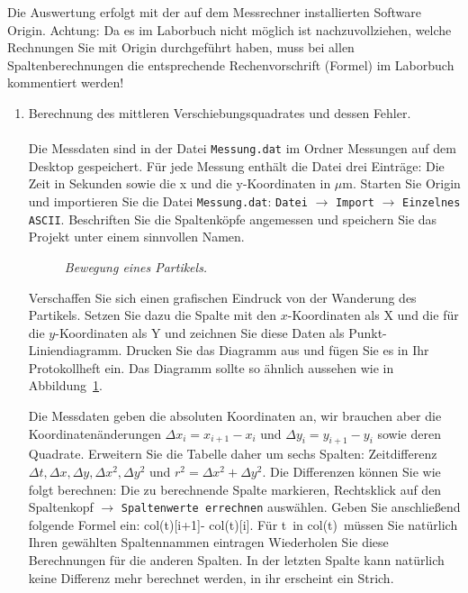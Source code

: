 \documentclass{../papanleitung}
\begin{document}
Die Auswertung erfolgt mit der auf dem Messrechner installierten Software Origin.
Achtung: Da es im Laborbuch nicht m\"{o}glich ist nachzuvollziehen, welche Rechnungen Sie mit Origin durchgef\"{u}hrt haben, muss bei allen Spaltenberechnungen die entsprechende Rechenvorschrift (Formel) im Laborbuch kommentiert werden!

\begin{enumerate}
\item Berechnung des mittleren Verschiebungsquadrates und dessen Fehler.\\
\\Die Messdaten sind in der Datei \verb"Messung.dat" im Ordner Messungen auf dem Desktop gespeichert. F\"{u}r jede Messung enth\"{a}lt die Datei drei Eintr\"{a}ge: Die Zeit in Sekunden sowie die x und die y-Koordinaten in $\mu$m.  Starten Sie Origin und importieren Sie die Datei \verb"Messung.dat":  \verb"Datei" $\rightarrow$ \verb"Import" $\rightarrow$ \verb"Einzelnes ASCII".
Beschriften Sie die Spaltenk\"{o}pfe angemessen und speichern Sie das Projekt unter einem sinnvollen Namen.

\begin{figure}[h]
\begin{minipage}[c]{12cm}
\centering{}
\centering\caption{\label{223_auswertung1}\fontsize{10}{12}\it
Bewegung eines Partikels.}
\end{minipage}
\end{figure}

Verschaffen Sie sich einen grafischen Eindruck von der Wanderung des Partikels. Setzen Sie dazu die Spalte mit den $x$-Koordinaten als X und die f\"{u}r die $y$-Koordinaten als Y und zeichnen Sie diese Daten als Punkt-Liniendiagramm. Drucken Sie das Diagramm aus und f\"{u}gen Sie es in Ihr Protokollheft ein.
Das Diagramm sollte so \"{a}hnlich aussehen wie in Abbildung~\ref{223_auswertung1}.

Die Messdaten geben die absoluten Koordinaten an, wir brauchen aber die
Koordinaten\"{a}nderungen $\Delta x_i = x_{i+1} - x_i$   und $\Delta y_i = y_{i+1} - y_i$ sowie deren Quadrate. Erweitern
Sie die Tabelle daher um sechs Spalten: Zeitdifferenz $\Delta t, \Delta x, \Delta y, \Delta x^2,
\Delta y^2$ und $r^2=\Delta x^2+\Delta y^2$. Die Differenzen k\"{o}nnen Sie wie folgt berechnen:
Die zu berechnende Spalte markieren, Rechtsklick auf den Spaltenkopf $\rightarrow$ \verb"Spaltenwerte errechnen" ausw\"{a}hlen. Geben Sie anschlie{\ss}end folgende Formel ein: col(t)[i+1]- col(t)[i]. F\"{u}r \glqq t\grqq~in \glqq col(t)\grqq~m\"{u}ssen Sie nat\"{u}rlich Ihren gew\"{a}hlten Spaltennammen eintragen Wiederholen Sie diese Berechnungen f\"{u}r die anderen Spalten. In der letzten Spalte kann nat\"{u}rlich keine Differenz mehr berechnet werden, in ihr erscheint ein Strich.


\end{enumerate}
\end{document}
